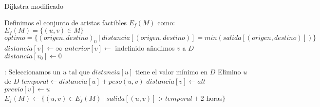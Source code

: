 \begin{algoritmo}[H]
\caption{Dijkstra modificado}\label{dijkstra_modificado}
\begin{algorithmic}[1]
\State Definimos el conjunto de aristas factibles $E_{f}(M)$ como: $E_{f}(M) = \{(u,v) \in M\}$
	\State $optimo = \{{(origen, destino)}_{0}\ |\ distancia[(origen, destino)] = min(salida[(origen, destino)])\}$
\Else
		\State $distancia[v] \gets \infty$
		\State $anterior[v] \gets $ indefinido
		\State añadimos $v$ a $D$
	\EndFor
	\State $distancia[v_{0}] \gets 0$
	
	:
		\State Seleccionamos un $u$ tal que $distancia[u]$ tiene el valor mínimo en $D$
		\State Elimino $u$ de $D$
			\State $temporal \gets distancia[u] + peso(u, v)$
				\State $distancia[v] \gets alt$
				\State $previo[v] \gets u$
				\State $E_{f}(M) \gets \{(u, v) \in E_{f}(M)\ |\ salida[(u,v)] > temporal + 2$ horas$\}$
			\EndIf
		\EndFor
	\EndWhile
\EndIf
\EndProcedure
\end{algorithmic}
\end{algoritmo}

\newpage
